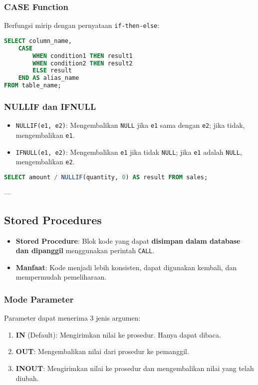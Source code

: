 \documentclass{article}
\begin{document}
\subsubsection{CASE Function}
Berfungsi mirip dengan pernyataan \texttt{if-then-else}:
\begin{lstlisting}[language=SQL, caption={Sintaks CASE Function}, captionpos=b]
SELECT column_name,
    CASE
        WHEN condition1 THEN result1
        WHEN condition2 THEN result2
        ELSE result
    END AS alias_name
FROM table_name;
\end{lstlisting}

\subsubsection{NULLIF dan IFNULL}
\begin{itemize}
    \item \texttt{NULLIF(e1, e2)}: Mengembalikan \texttt{NULL} jika \texttt{e1} sama dengan \texttt{e2}; jika tidak, mengembalikan \texttt{e1}.
    \item \texttt{IFNULL(e1, e2)}: Mengembalikan \texttt{e1} jika tidak \texttt{NULL}; jika \texttt{e1} adalah \texttt{NULL}, mengembalikan \texttt{e2}.
\end{itemize}
\begin{lstlisting}[language=SQL, caption={Contoh NULLIF untuk Menghindari Pembagian Nol}, captionpos=b]
SELECT amount / NULLIF(quantity, 0) AS result FROM sales;
\end{lstlisting}

---

\subsection{Stored Procedures}
\begin{itemize}
    \item \textbf{Stored Procedure}: Blok kode yang dapat \textbf{disimpan dalam database dan dipanggil} menggunakan perintah \texttt{CALL}.
    \item \textbf{Manfaat}: Kode menjadi lebih konsisten, dapat digunakan kembali, dan mempermudah pemeliharaan.
\end{itemize}

\subsubsection{Mode Parameter}
Parameter dapat menerima 3 jenis argumen:
\begin{enumerate}
    \item \textbf{IN} (Default): Mengirimkan nilai ke prosedur. Hanya dapat dibaca.
    \item \textbf{OUT}: Mengembalikan nilai dari prosedur ke pemanggil.
    \item \textbf{INOUT}: Mengirimkan nilai ke prosedur dan mengembalikan nilai yang telah diubah.
\end{enumerate}
\end{document}
